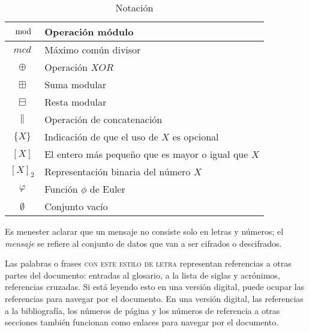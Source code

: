 \begin{table}[H]
\begin{center}
\begin{tabular}{c|l}
      \hline
      $\mod$ & Operación módulo \\
      \hline
      $mcd$ & Máximo común divisor \\
      \hline
      $\oplus$ & Operación $XOR$ \\
      \hline
      $\boxplus$ & Suma modular \\
      \hline
      $\boxminus$ & Resta modular \\
      \hline
      $\parallel$ & Operación de concatenación \\
      \hline
      $\{X\}$ & Indicación de que el uso de $X$ es opcional \\
      \hline
      $[X]$ & El entero más pequeño que es mayor o igual que $X$ \\
      \hline
      $[X]_2$ & Representación binaria del número $X$ \\
      \hline
      $\varphi$ & Función $\phi$ de Euler \\
      \hline
      $\emptyset$ & Conjunto vacío \\
      \hline
    \end{tabular}
    \caption{Notación}\label{tab:simb}
  \end{center}
\end{table}

Es menester aclarar que un mensaje no consiste solo en letras y números;
el \textit{mensaje} se refiere al conjunto de datos que van a ser
cifrados o descifrados.

Las palabras o frases \textsc{con este estilo de letra} representan
referencias a otras partes del documento: entradas al glosario, a la lista de
siglas y acrónimos, referencias cruzadas. Si está leyendo esto en una
versión digital, puede ocupar las referencias para navegar por el documento.
En una versión digital, las referencias a la bibliografía, los números de
página y los números de referencia a otras secciones también funcionan
como enlaces para navegar por el documento.
